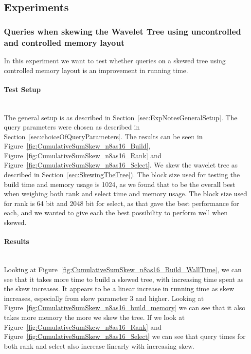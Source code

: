 \subsection{Experiments}

\subsubsection{Queries when skewing the Wavelet Tree using uncontrolled and controlled memory layout}
In this experiment we want to test whether queries on a skewed tree using controlled memory layout is an improvement in running time.

\paragraph{Test Setup}~\\
The general setup is as described in Section~\ref{sec:ExpNotesGeneralSetup}.
The query parameters were chosen as described in Section~\ref{sec:choiceOfQueryParameters}.
The results can be seen in Figure~\ref{fig:CumulativeSumSkew_n8as16_Build}, Figure~\ref{fig:CumulativeSumSkew_n8as16_Rank} and Figure~\ref{fig:CumulativeSumSkew_n8as16_Select}.
We skew the wavelet tree as described in Section~\ref{sec:SkewingTheTree}).
The block size used for testing the build time and memory usage is 1024, as we found that to be the overall best when weighing both rank and select time and memory usage.
The block size used for rank is 64 bit and 2048 bit for select, as that gave the best performance for each, and we wanted to give each the best possibility to perform well when skewed.

\paragraph{Results}~\\
Looking at Figure~\ref{fig:CumulativeSumSkew_n8as16_Build_WallTime}, we can see that it takes more time to build a skewed tree, with increasing time spent as the skew increases.
It appears to be a linear increase in running time as skew increases, especially from skew parameter 3 and higher.
Looking at Figure~\ref{fig:CumulativeSumSkew_n8as16_build_memory} we can see that it also takes more memory the more we skew the tree.
If we look at Figure~\ref{fig:CumulativeSumSkew_n8as16_Rank} and Figure~\ref{fig:CumulativeSumSkew_n8as16_Select} we can see that query times for both rank and select also increase linearly with increasing skew.

